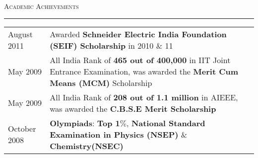 \documentclass[8pt,a4paper,English]{article}
\newcommand{\lv}{\color{table-border}\vrule}
\newcommand\roottitle[1]{ \vspace{3mm} \noindent \textsc{ \large #1} \vspace{1.5mm} \nopagebreak[4] \color{gray} \hrule \color{black} \vspace{2mm} \noindent \small }
\begin{document}
\roottitle{Academic Achievements}
\renewcommand{\arraystretch}{1.2}
\setlength\tabcolsep{8pt}
\begin{tabularx}{\textwidth}{ R{2.6cm} !{\lv} X }
  August 2011  & Awarded \textbf{ Schneider Electric India Foundation (SEIF) Scholarship } in 2010 \& 11 \\
  May 2009     & All India Rank of \textbf{465 out of 400,000 } in IIT Joint Entrance Examination, was awarded the \textbf{Merit Cum Means (MCM)} Scholarship \\
  May 2009	   & All India Rank of \textbf{208 out of 1.1 million} in AIEEE, was awarded the \textbf{C.B.S.E Merit Scholarship} \\
  October 2008 & \textbf{Olympiads}: \textbf{Top $\bm{1\%}$}, \textbf{National Standard Examination in Physics (NSEP)} \& \textbf{Chemistry(NSEC)} \\
\end{tabularx}

\end{document}
